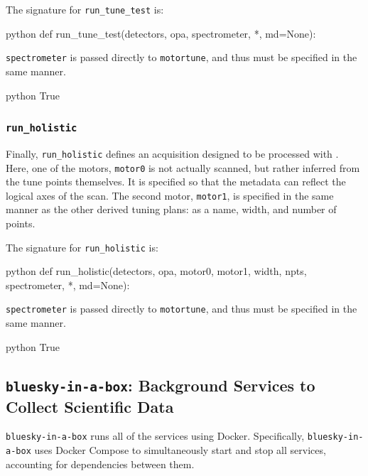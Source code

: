 The signature for \texttt{run\_tune\_test} is:

\begin{codefragment}{python}
def run_tune_test(detectors, opa, spectrometer, *, md=None):
\end{codefragment}

\texttt{spectrometer} is passed directly to \texttt{motortune}, and thus must be specified in the same manner.

\begin{codefragment}{python}
True
\end{codefragment}

\subsubsection{\texttt{run\_holistic}}

Finally, \texttt{run\_holistic} defines an acquisition designed to be processed with .
Here, one of the motors, \texttt{motor0} is not actually scanned, but rather inferred from the tune points themselves.
It is specified so that the metadata can reflect the logical axes of the scan.
The second motor, \texttt{motor1}, is specified in the same manner as the other derived tuning plans: as a name, width, and number of points.

The signature for \texttt{run\_holistic} is:

\begin{codefragment}{python}
def run_holistic(detectors, opa, motor0, motor1, width, npts, spectrometer, *, md=None):
\end{codefragment}

\texttt{spectrometer} is passed directly to \texttt{motortune}, and thus must be specified in the same manner.

\begin{codefragment}{python}
True
\end{codefragment}


\subsection{\texttt{bluesky-in-a-box}: Background Services to Collect Scientific Data}

\texttt{bluesky-in-a-box} runs all of the services using Docker\cite{}.
Specifically, \texttt{bluesky-in-a-box} uses Docker Compose\cite{} to simultaneously start and stop all services, accounting for dependencies between them.

